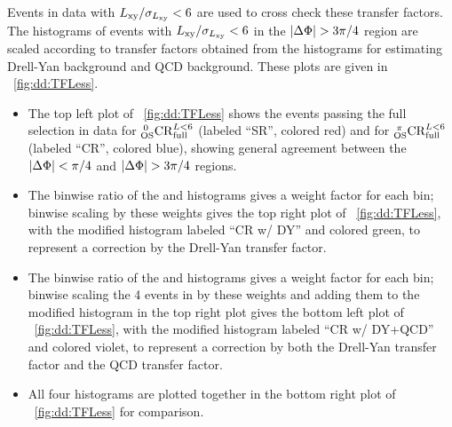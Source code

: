 Events in data with $\LxySig < 6$ are used to cross check these transfer factors.
The histograms of events with $\LxySig < 6$ in the $\DeltaPhi > 3\pi/4$ region are scaled according to transfer factors obtained from the histograms for estimating Drell-Yan background and QCD background.
These plots are given in \Fig~\ref{fig:dd:TFLess}.
\begin{itemize}
  \item The top left plot of \Fig~\ref{fig:dd:TFLess} shows the events passing the full selection in data for $\CR{\Full}{<6}{0}$ (labeled ``SR'', colored red) and for $\CR{\Full}{<6}{\pi}$ (labeled ``CR'', colored blue), showing general agreement between the $\DeltaPhi < \pi/4$ and $\DeltaPhi > 3\pi/4$ regions.
  \item The binwise ratio of the  and  histograms gives a weight factor for each \LxySig bin; binwise scaling  by these weights gives the top right plot of \Fig~\ref{fig:dd:TFLess}, with the modified histogram labeled ``CR w/ DY'' and colored green, to represent a correction by the Drell-Yan transfer factor.
  \item The binwise ratio of the  and  histograms gives a weight factor for each \LxySig bin; binwise scaling the 4 events in  by these weights and adding them to the modified  histogram in the top right plot gives the bottom left plot of \Fig~\ref{fig:dd:TFLess}, with the modified histogram labeled ``CR w/ DY+QCD'' and colored violet, to represent a correction by both the Drell-Yan transfer factor and the QCD transfer factor.
  \item All four histograms are plotted together in the bottom right plot of \Fig~\ref{fig:dd:TFLess} for comparison.
\end{itemize}

